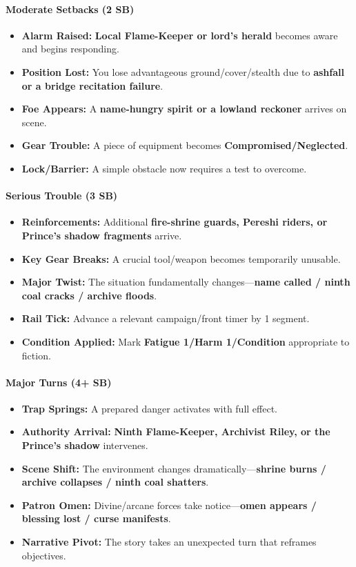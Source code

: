 \paragraph{Moderate Setbacks (2 SB)}
\begin{itemize}
\item \textbf{Alarm Raised:} \textbf{Local Flame-Keeper or lord's herald} becomes aware and begins responding.
\item \textbf{Position Lost:} You lose advantageous ground/cover/stealth due to \textbf{ashfall or a bridge recitation failure}.
\item \textbf{Foe Appears:} A \textbf{name-hungry spirit or a lowland reckoner} arrives on scene.
\item \textbf{Gear Trouble:} A piece of equipment becomes \textbf{Compromised/Neglected}.
\item \textbf{Lock/Barrier:} A simple obstacle now requires a test to overcome.
\end{itemize}

\paragraph{Serious Trouble (3 SB)}
\begin{itemize}
\item \textbf{Reinforcements:} Additional \textbf{fire-shrine guards, Pereshi riders, or Prince's shadow fragments} arrive.
\item \textbf{Key Gear Breaks:} A crucial tool/weapon becomes temporarily unusable.
\item \textbf{Major Twist:} The situation fundamentally changes---\textbf{name called / ninth coal cracks / archive floods}.
\item \textbf{Rail Tick:} Advance a relevant campaign/front timer by 1 segment.
\item \textbf{Condition Applied:} Mark \textbf{Fatigue 1/Harm 1/Condition} appropriate to fiction.
\end{itemize}

\paragraph{Major Turns (4+ SB)}
\begin{itemize}
\item \textbf{Trap Springs:} A prepared danger activates with full effect.
\item \textbf{Authority Arrival:} \textbf{Ninth Flame-Keeper, Archivist Riley, or the Prince's shadow} intervenes.
\item \textbf{Scene Shift:} The environment changes dramatically---\textbf{shrine burns / archive collapses / ninth coal shatters}.
\item \textbf{Patron Omen:} Divine/arcane forces take notice---\textbf{omen appears / blessing lost / curse manifests}.
\item \textbf{Narrative Pivot:} The story takes an unexpected turn that reframes objectives.
\end{itemize}

